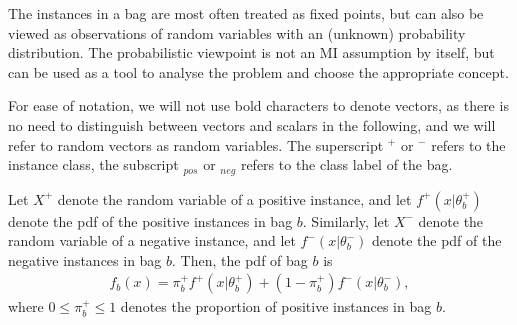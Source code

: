 The instances in a bag are most often treated as fixed points, but can also be viewed as observations of random variables with an (unknown) probability distribution. 
The probabilistic viewpoint is not an MI assumption by itself, but can be used as a tool to analyse the problem and choose the appropriate concept. 

For ease of notation, we will not use bold characters to denote vectors, as there is no need to distinguish between vectors and scalars in the following, and we will refer to random vectors as random variables.
The superscript $^+$ or $^-$ refers to the instance class, the subscript $_{pos}$ or $_{neg}$ refers to the class label of the bag. 

Let $X^+$ denote the random variable of a positive instance, and let $f^+(x|\theta_b^+)$ denote the pdf of the positive instances in bag $b$. 
Similarly, let $X^-$ denote the random variable of a negative instance, and let $f^-(x|\theta_b^-)$ denote the pdf of the negative instances in bag $b$. 
Then, the pdf of bag $b$ is
\begin{align}
  f_b(x) = \pi^+_b f^+(x|\theta_b^+) + (1-\pi^+_b)f^-(x|\theta_b^-),
\end{align}
where $0 \leq \pi^+_b \leq 1$ denotes the proportion of positive instances in bag $b$. 

